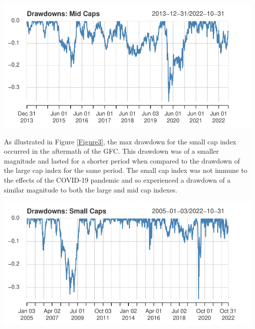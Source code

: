 \documentclass[11pt,preprint, authoryear]{elsarticle}
\let\origfigure\figure
\let\endorigfigure\endfigure
\renewenvironment{figure}[1][2] {
    \expandafter\origfigure\expandafter[H]
} {
    \endorigfigure
}
\numberwithin{equation}{section}
\numberwithin{figure}{section}
\numberwithin{table}{section}
\begin{document}
\begin{figure}[H]

{\centering \includegraphics{Volatility-of-Shares_files/figure-latex/Figure2-1} 

}

\caption{Mid Cap drawdown chart \label{Figure2}}\label{fig:Figure2}
\end{figure}

As illustrated in Figure \ref{Figure3}, the max drawdown for the small
cap index occurred in the aftermath of the GFC. This drawdown was of a
smaller magnitude and lasted for a shorter period when compared to the
drawdown of the large cap index for the same period. The small cap index
was not immune to the effects of the COVID-19 pandemic and so
experienced a drawdown of a similar magnitude to both the large and mid
cap indexes.

\begin{figure}[H]

{\centering \includegraphics{Volatility-of-Shares_files/figure-latex/Figure3-1} 

}

\caption{Small Cap drawdown chart \label{Figure3}}\label{fig:Figure3}
\end{figure}
\end{document}

